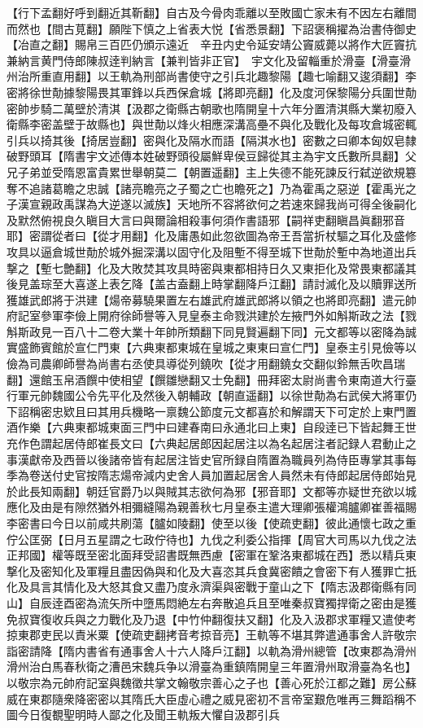【行下孟翻好呼到翻近其靳翻】自古及今骨肉乖離以至敗國亡家未有不因左右離間而然也【間古莧翻】願陛下慎之上省表大悦【省悉景翻】下詔褒稱擢為治書侍御史【冶直之翻】賜帛三百匹仍頒示遠近　辛丑内史令延安靖公竇威薨以將作大匠竇抗兼納言黄門侍郎陳叔逹判納言【兼判皆非正官】　宇文化及留輜重於滑臺【滑臺滑州治所重直用翻】以王軌為刑部尚書使守之引兵北趣黎陽【趣七喻翻又逡須翻】李密將徐世勣據黎陽畏其軍鋒以兵西保倉城【將即亮翻】化及度河保黎陽分兵圍世勣密帥步騎二萬壁於清淇【汲郡之衛縣古朝歌也隋開皇十六年分置清淇縣大業初廢入衛縣李密盖壁于故縣也】與世勣以烽火相應深溝高壘不與化及戰化及每攻倉城密輒引兵以掎其後【掎居豈翻】密與化及隔水而語【隔淇水也】密數之曰卿本匈奴皂隸破野頭耳【隋書宇文述傳本姓破野頭役屬鮮卑侯豆歸從其主為宇文氏數所具翻】父兄子弟並受隋恩富貴累世舉朝莫二【朝置遥翻】主上失德不能死諫反行弑逆欲規簒奪不追諸葛瞻之忠誠【諸亮瞻亮之子蜀之亡也瞻死之】乃為霍禹之惡逆【霍禹光之子漢宣親政禹謀為大逆遂以滅族】天地所不容將欲何之若速來歸我尚可得全後嗣化及默然俯視良久瞋目大言曰與爾論相殺事何須作書語邪【嗣祥吏翻瞋昌眞翻邪音耶】密謂從者曰【從才用翻】化及庸愚如此忽欲圖為帝王吾當折杖驅之耳化及盛修攻具以逼倉城世勣於城外掘深溝以固守化及阻塹不得至城下世勣於塹中為地道出兵撃之【塹七艶翻】化及大敗焚其攻具時密與東都相持日久又東拒化及常畏東都議其後見盖琮至大喜遂上表乞降【盖古盍翻上時掌翻降戶江翻】請討滅化及以贖罪送所獲雄武郎將于洪建【煬帝募驍果置左右雄武府雄武郎將以領之也將即亮翻】遣元帥府記室參軍李儉上開府徐師譽等入見皇泰主命戮洪建於左掖門外如斛斯政之法【戮斛斯政見一百八十二卷大業十年帥所類翻下同見賢遍翻下同】元文都等以密降為誠實盛飾賓館於宣仁門東【六典東都東城在皇城之東東曰宣仁門】皇泰主引見儉等以儉為司農卿師譽為尚書右丞使具導從列鐃吹【從才用翻鐃女交翻似鈴無舌吹昌瑞翻】還館玉帛酒饌中使相望【饌雛戀翻又士免翻】冊拜密太尉尚書令東南道大行臺行軍元帥魏國公令先平化及然後入朝輔政【朝直遥翻】以徐世勣為右武侯大將軍仍下詔稱密忠欵且曰其用兵機略一禀魏公節度元文都喜於和解謂天下可定於上東門置酒作樂【六典東都城東面三門中曰建春南曰永通北曰上東】自段逹已下皆起舞王世充作色謂起居侍郎崔長文曰【六典起居郎因起居注以為名起居注者記録人君動止之事漢獻帝及西晉以後諸帝皆有起居注皆史官所録自隋置為職員列為侍臣專掌其事每季為卷送付史官按隋志煬帝減内史舍人員加置起居舍人員然未有侍郎起居侍郎始見於此長知兩翻】朝廷官爵乃以與賊其志欲何為邪【邪音耶】文都等亦疑世充欲以城應化及由是有隙然猶外相彌縫陽為親善秋七月皇泰主遣大理卿張權鴻臚卿崔善福賜李密書曰今日以前咸共刷蕩【臚如陵翻】使至以後【使疏吏翻】彼此通懷七政之重佇公匡弼【日月五星謂之七政佇待也】九伐之利委公指揮【周官大司馬以九伐之法正邦國】權等既至密北面拜受詔書既無西慮【密軍在鞏洛東都城在西】悉以精兵東撃化及密知化及軍糧且盡因偽與和化及大喜恣其兵食冀密饋之會密下有人獲罪亡扺化及具言其情化及大怒其食又盡乃度永濟渠與密戰于童山之下【隋志汲郡衛縣有同山】自辰逹酉密為流矢所中墮馬悶絶左右奔散追兵且至唯秦叔寶獨捍衛之密由是獲免叔寶復收兵與之力戰化及乃退【中竹仲翻復扶又翻】化及入汲郡求軍糧又遣使考掠東郡吏民以責米粟【使疏吏翻拷音考掠音亮】王軌等不堪其弊遣通事舍人許敬宗詣密請降【隋内書省有通事舍人十六人降戶江翻】以軌為滑州總管【改東郡為滑州滑州治白馬春秋衛之漕邑宋魏兵争以滑臺為重鎮隋開皇三年置滑州取滑臺為名也】以敬宗為元帥府記室與魏徵共掌文翰敬宗善心之子也【善心死於江都之難】房公蘇威在東郡隨衆降密密以其隋氏大臣虛心禮之威見密初不言帝室艱危唯再三舞蹈稱不圖今日復覩聖明時人鄙之化及聞王軌叛大懼自汲郡引兵